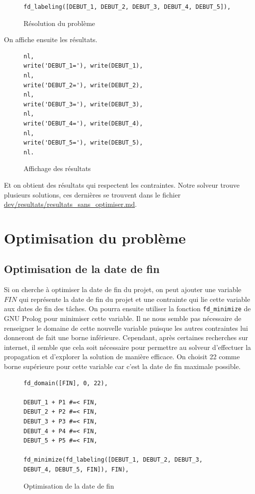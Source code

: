 \documentclass{latexPackage/utc-report/utc-report}
\begin{document}
\begin{figure}[h!]
    \begin{verbatim}
fd_labeling([DEBUT_1, DEBUT_2, DEBUT_3, DEBUT_4, DEBUT_5]),
    \end{verbatim}
    \caption{Résolution du problème}
\end{figure}

On affiche ensuite les résultats.

\begin{figure}[h!]
    \begin{verbatim}
nl,
write('DEBUT_1='), write(DEBUT_1),
nl,
write('DEBUT_2='), write(DEBUT_2),
nl,
write('DEBUT_3='), write(DEBUT_3),
nl,
write('DEBUT_4='), write(DEBUT_4),
nl,
write('DEBUT_5='), write(DEBUT_5),
nl.
    \end{verbatim}
    \caption{Affichage des résultats}
\end{figure}

Et on obtient des résultats qui respectent les contraintes. Notre solveur trouve plusieurs solutions, ces dernières se trouvent dans le fichier \url{dev/resultats/resultats_sans_optimiser.md}.

\pagebreak

\section{Optimisation du problème}

\subsection{Optimisation de la date de fin}

Si on cherche à optimiser la date de fin du projet, on peut ajouter une variable $FIN$ qui représente la date de fin du projet et une contrainte qui lie cette variable aux dates de fin des tâches. On pourra ensuite utiliser la fonction \texttt{fd\_minimize} de GNU Prolog pour minimiser cette variable. Il ne nous semble pas nécessaire de renseigner le domaine de cette nouvelle variable puisque les autres contraintes lui donneront de fait une borne inférieure. Cependant, après certaines recherches sur internet, il semble que cela soit nécessaire pour permettre au solveur d’effectuer la propagation et d’explorer la solution de manière efficace. On choisit 22 comme borne supérieure pour cette variable car c’est la date de fin maximale possible.

\begin{figure}[h!]
    \begin{verbatim}
fd_domain([FIN], 0, 22),

DEBUT_1 + P1 #=< FIN,
DEBUT_2 + P2 #=< FIN,
DEBUT_3 + P3 #=< FIN,
DEBUT_4 + P4 #=< FIN,
DEBUT_5 + P5 #=< FIN,

fd_minimize(fd_labeling([DEBUT_1, DEBUT_2, DEBUT_3, DEBUT_4, DEBUT_5, FIN]), FIN),
    \end{verbatim}
    \caption{Optimisation de la date de fin}
\end{figure}
\end{document}
